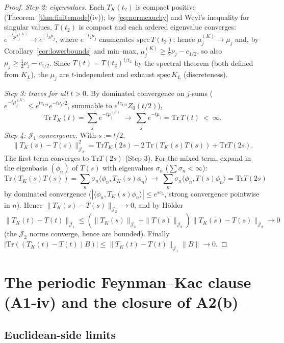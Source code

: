 \documentclass[11pt,a4paper]{article}
\theoremstyle{plain}
\theoremstyle{definition}
\newcommand{\Jone}{\mathcal J_1}
\newcommand{\Jtwo}{\mathcal J_2}
\newcommand{\ip}[2]{\langle #1,#2\rangle}
\newcommand{\Trace}{\mathrm{Tr}}
\begin{document}
\begin{proof}
\emph{Step 2: eigenvalues.} Each $T_K(t_2)$ is compact positive
(Theorem~\ref{thm:finitemode}(iv)); by \eqref{eq:normcauchy} and Weyl's
inequality for singular values, $T(t_2)$ is compact and each ordered
eigenvalue converges: $e^{-t_2\mu^{(K)}_j}\to e^{-t_2\mu_j}$, where
$e^{-t_2\mu_j}$ enumerates $\mathrm{spec}\,T(t_2)$; hence
$\mu^{(K)}_j\to\mu_j$ and, by Corollary~\ref{cor:lowerbounds} and
min--max, $\mu^{(K)}_j\ge\tfrac12\nu_j-c_{1/2}$, so also
$\mu_j\ge\tfrac12\nu_j-c_{1/2}$. Since $T(t)=T(t_2)^{t/t_2}$ by the
spectral theorem (both defined from $K_L$), the $\mu_j$ are
$t$-independent and exhaust $\mathrm{spec}\,K_L$ (discreteness).

\emph{Step 3: traces for all $t>0$.} By dominated convergence on
$j$-sums ($e^{-t\mu^{(K)}_j}\le e^{tc_{1/2}}e^{-t\nu_j/2}$, summable to
$e^{tc_{1/2}}Z_0(t/2)$),
\[
 \Trace\,T_K(t)=\sum_je^{-t\mu^{(K)}_j}
 \ \longrightarrow\ \sum_je^{-t\mu_j}=\Trace\,T(t)\ <\ \infty .
\]
\emph{Step 4: $\Jone$-convergence.} With $s:=t/2$,
\[
 \|T_K(s)-T(s)\|_{\Jtwo}^2=\Trace T_K(2s)-2\,\Trace(T_K(s)T(s))
 +\Trace T(2s).
\]
The first term converges to $\Trace T(2s)$ (Step 3).
For the mixed term, expand in the eigenbasis $(\phi_n)$ of $T(s)$ with
eigenvalues $\sigma_n$ ($\sum\sigma_n<\infty$):
\[
 \Trace(T_K(s)T(s))=\sum_n\sigma_n\ip{\phi_n}{T_K(s)\phi_n}
 \ \longrightarrow\
 \sum_n\sigma_n\ip{\phi_n}{T(s)\phi_n}=\Trace T(2s)
\]
by dominated
convergence ($|\ip{\phi_n}{T_K(s)\phi_n}|\le e^{sc_\lambda}$, strong
convergence pointwise in $n$). Hence
$\|T_K(s)-T(s)\|_{\Jtwo}\to0$, and by H\"older
$\|T_K(t)-T(t)\|_{\Jone}\le(\|T_K(s)\|_{\Jtwo}+\|T(s)\|_{\Jtwo})
\|T_K(s)-T(s)\|_{\Jtwo}\to0$ (the $\Jtwo$ norms converge, hence are
bounded). Finally $|\Trace((T_K(t)-T(t))B)|\le
\|T_K(t)-T(t)\|_{\Jone}\|B\|\to0$.
\end{proof}

\section{The periodic Feynman--Kac clause (A1-iv) and the closure of
A2(b)}\label{sec:A1iv}

\subsection{Euclidean-side limits}
\end{document}
